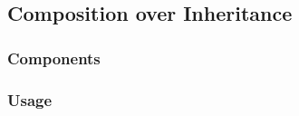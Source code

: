 \documentclass[10pt,letterpaper]{article}
\begin{document}
\subsection{Composition over Inheritance}

\subsubsection{Components}
\label{code:coi-component}

\subsubsection{Usage}
\label{code:coi-usage}

\end{document}
